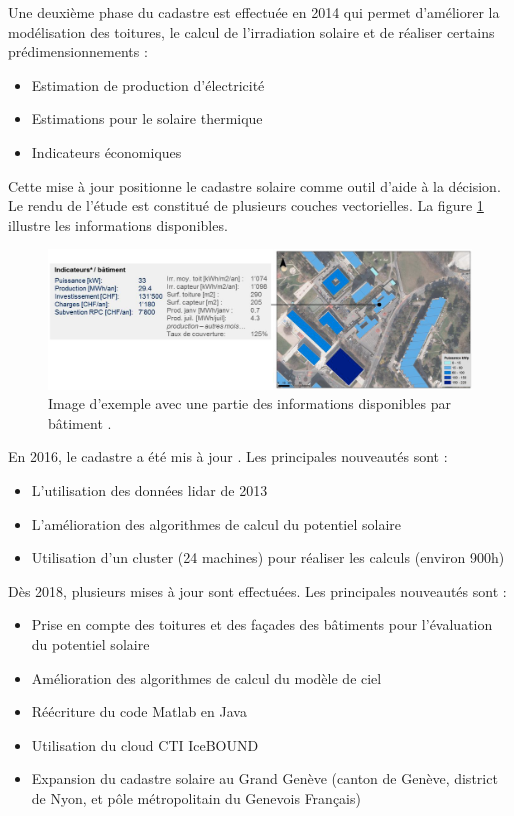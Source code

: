 \par{Une deuxième phase du cadastre est effectuée en 2014 \cite{desthieux_etude_2014} qui permet d'améliorer la modélisation des toitures, le calcul de l'irradiation solaire et de réaliser certains prédimensionnements :
\begin{itemize}
    \item Estimation de production d'électricité
    \item Estimations pour le solaire thermique
    \item Indicateurs économiques
\end{itemize}}
\par{Cette mise à jour positionne le cadastre solaire comme outil d'aide à la décision. Le rendu de l'étude est constitué de plusieurs couches vectorielles. La figure \ref{fig:cadastre_solaire_2014} illustre les informations disponibles.}
\begin{figure}[H]
    \centering
    \includegraphics[width=1\linewidth]{02-main//figures/ch2/cadastre_solaire_2014.png}
    \caption{Image d'exemple avec une partie des informations disponibles par bâtiment \cite{desthieux_etude_2014}.}
    \label{fig:cadastre_solaire_2014}
\end{figure}

\par{En 2016, le cadastre a été mis à jour \cite{desthieux_solar_2018}. Les principales nouveautés sont :
\begin{itemize}
    \item L'utilisation des données \gls{lidar} de 2013 \cite{sitg_nuages_2013}
    \item L'amélioration des algorithmes de calcul du potentiel solaire
    \item Utilisation d'un cluster (24 machines) pour réaliser les calculs (environ 900h)
\end{itemize}}

\par{Dès 2018, plusieurs mises à jour \cite{desthieux_solar_2018} sont effectuées. Les principales nouveautés sont :
\begin{itemize}
    \item Prise en compte des toitures et des façades des bâtiments pour l'évaluation du potentiel solaire
    \item Amélioration des algorithmes de calcul du modèle de ciel
    \item Réécriture du code Matlab en Java
    \item Utilisation du cloud CTI IceBOUND
    \item Expansion du cadastre solaire au Grand Genève (canton de Genève, district de Nyon, et pôle métropolitain du Genevois Français)
\end{itemize}}

